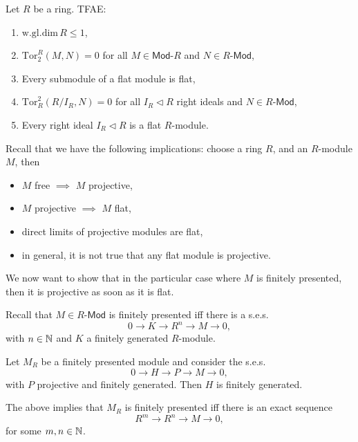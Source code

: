 \begin{prop}
	Let $R$ be a ring. TFAE:
	\begin{enumerate}
		\item $\mathrm{w.gl.dim}\, R \leq 1$,
		\item $\mathrm{Tor}^R_2(M,N) = 0$ for all $M \in \mathsf{Mod}\text{-}R$ and $N \in R\text{-}\mathsf{Mod}$,
		\item Every submodule of a flat module is flat,
		\item $\mathrm{Tor}^2_R(R/I_R, N) = 0$ for all $I_R \triangleleft R$ right ideals
			and $N \in R\text{-}\mathsf{Mod}$,
		\item Every right ideal $I_R \triangleleft R$ is a flat $R$-module.
	\end{enumerate}
\end{prop} 

\begin{rem}[]
	Recall that we have the following implications:
	choose a ring $R$, and an $R$-module $M$, then
	\begin{itemize}
		\item $M$ free $\implies$ $M$ projective,
		\item $M$ projective $\implies$ $M$ flat,
		\item direct limits of projective modules are flat,
		\item in general, it is not true that any flat module is projective.
	\end{itemize}
	We now want to show that in the particular case where $M$ is finitely presented, then
	it is projective as soon as it is flat.
\end{rem}

\begin{defn}
	Recall that $M \in R\text{-}\mathsf{Mod}$ is finitely presented iff there is a s.e.s.
	\begin{equation}
	0 \to K \to R^n \to M \to 0
	,\end{equation} 
	with $n \in \mathbb{N}$ and $K$ a finitely generated $R$-module.
\end{defn}

\begin{lem}
	Let $M_R$ be a finitely presented module and consider the s.e.s.
	\begin{equation}
	0 \to H \to P \to M \to 0
	,\end{equation} 
	with $P$ projective and finitely generated.
	Then $H$ is finitely generated.
\end{lem} 
\begin{rem}[]
	The above implies that $M_R$ is finitely presented iff there is an exact sequence
	\begin{equation}
	R^m \to R^n \to M \to 0
	,\end{equation} 
	for some $m,n \in \mathbb{N}$.
\end{rem}

